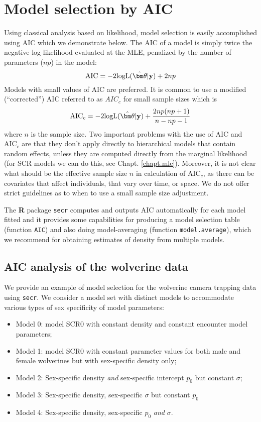 \section{Model selection by AIC}
\label{gof.sec.aic}

Using classical analysis based on likelihood, model selection
is easily accomplished using AIC \citep{burnham_anderson:2002}
which we demonstrate below. The AIC of a model is simply twice the
negative log-likelihood evaluated at the MLE, penalized by the number of parameters
($np$) in the model:
\[
 \mbox{AIC} = -2 \mbox{logL}(\hat{\bm \theta}|{\bf y})  + 2 np
\]
Models with small values of AIC are preferred.
It is common to use a modified (``corrected'') AIC referred to as $AIC_{c}$ for small
sample sizes which is
\[
 \mbox{AIC}_{c}  =
-2 \mbox{logL}(\hat{\bm \theta}|{\bf y})  + \frac{2 np
  (np+1)}{n-np-1}
\]
where $n$ is the sample size.  Two important problems with the use of
AIC and AIC$_{c}$ are that they don't apply directly to hierarchical
models that contain random effects, unless they are computed directly
from the marginal likelihood (for SCR models we can do this, see
Chapt. \ref{chapt.mle}). Moreover, it is not clear what should be the
effective sample size $n$ in calculation of AIC$_{c}$, as there can be
covariates that affect individuals, that vary over time, or space.
We do not offer strict guidelines as to when to use a small sample
size adjustment.

The {\bf R} package \mbox{\tt secr} computes and outputs AIC
automatically for each model fitted and it provides some capabilities
for producing a model selection table (function \mbox{\tt AIC}) and
also doing model-averaging (function \mbox{\tt model.average}), which
we recommend for obtaining estimates of density from multiple models.

\subsection{AIC analysis of the wolverine data}

We provide an example of model selection for the wolverine camera
trapping data using \mbox{\tt secr}.
 We consider a model set with  distinct models to accommodate
various types of sex specificity of model parameters:
\hspace{.5in} \begin{itemize}
\item[] Model 0: model SCR0 with constant density and constant
  encounter model parameters;

\item[] Model 1: model SCR0 with constant parameter
values for both male and female wolverines but with sex-specific
density only;

\item[] Model 2: Sex-specific density {\it and} sex-specific intercept
$p_{0}$ but constant $\sigma$;

\item[] Model 3: Sex-specific density, sex-specific $\sigma$ but constant
$p_{0}$

\item[] Model 4: Sex-specific density, sex-specific $p_{0}$ {\it and} $\sigma$.
\end{itemize}

